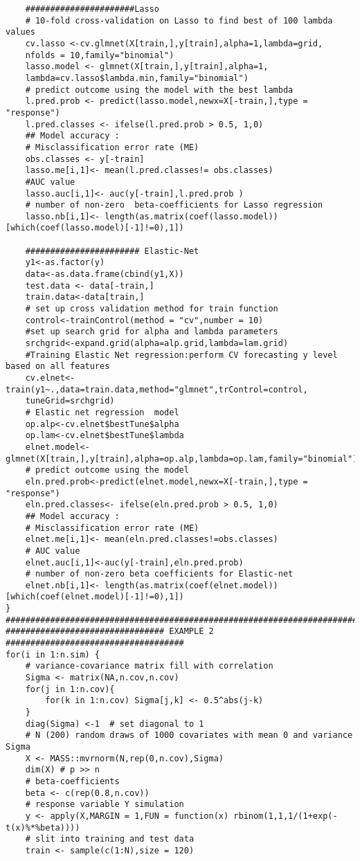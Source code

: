 \documentclass[12pt]{report}
\begin{document}
\begin{lstlisting}
	######################Lasso
	# 10-fold cross-validation on Lasso to find best of 100 lambda values
	cv.lasso <-cv.glmnet(X[train,],y[train],alpha=1,lambda=grid,
	nfolds = 10,family="binomial")
	lasso.model <- glmnet(X[train,],y[train],alpha=1,
	lambda=cv.lasso$lambda.min,family="binomial")
	# predict outcome using the model with the best lambda
	l.pred.prob <- predict(lasso.model,newx=X[-train,],type = "response")
	l.pred.classes <- ifelse(l.pred.prob > 0.5, 1,0)
	## Model accuracy :
	# Misclassification error rate (ME)
	obs.classes <- y[-train]
	lasso.me[i,1]<- mean(l.pred.classes!= obs.classes)
	#AUC value
	lasso.auc[i,1]<- auc(y[-train],l.pred.prob )
	# number of non-zero  beta-coefficients for Lasso regression
	lasso.nb[i,1]<- length(as.matrix(coef(lasso.model))[which(coef(lasso.model)[-1]!=0),1])
	
	####################### Elastic-Net
	y1<-as.factor(y)
	data<-as.data.frame(cbind(y1,X))
	test.data <- data[-train,]
	train.data<-data[train,]
	# set up cross validation method for train function
	control<-trainControl(method = "cv",number = 10)
	#set up search grid for alpha and lambda parameters
	srchgrid<-expand.grid(alpha=alp.grid,lambda=lam.grid)
	#Training Elastic Net regression:perform CV forecasting y level based on all features
	cv.elnet<-train(y1~.,data=train.data,method="glmnet",trControl=control,
	tuneGrid=srchgrid)
	# Elastic net regression  model 
	op.alp<-cv.elnet$bestTune$alpha
	op.lam<-cv.elnet$bestTune$lambda
	elnet.model<-glmnet(X[train,],y[train],alpha=op.alp,lambda=op.lam,family="binomial")
	# predict outcome using the model
	eln.pred.prob<-predict(elnet.model,newx=X[-train,],type = "response")
	eln.pred.classes<- ifelse(eln.pred.prob > 0.5, 1,0)	
	## Model accuracy :
	# Misclassification error rate (ME)
	elnet.me[i,1]<- mean(eln.pred.classes!=obs.classes)
	# AUC value
	elnet.auc[i,1]<-auc(y[-train],eln.pred.prob)
	# number of non-zero beta coefficients for Elastic-net
	elnet.nb[i,1]<- length(as.matrix(coef(elnet.model))[which(coef(elnet.model)[-1]!=0),1])
}
###############################################################################
################################ EXAMPLE 2 ####################################
for(i in 1:n.sim) {
	# variance-covariance matrix fill with correlation
	Sigma <- matrix(NA,n.cov,n.cov) 
	for(j in 1:n.cov){
		for(k in 1:n.cov) Sigma[j,k] <- 0.5^abs(j-k)
	}
	diag(Sigma) <-1  # set diagonal to 1
	# N (200) random draws of 1000 covariates with mean 0 and variance Sigma
	X <- MASS::mvrnorm(N,rep(0,n.cov),Sigma)
	dim(X) # p >> n 
	# beta-coefficients
	beta <- c(rep(0.8,n.cov))
	# response variable Y simulation
	y <- apply(X,MARGIN = 1,FUN = function(x) rbinom(1,1,1/(1+exp(-t(x)%*%beta))))
	# slit into training and test data
	train <- sample(c(1:N),size = 120)
	

\end{lstlisting}
\end{document}
